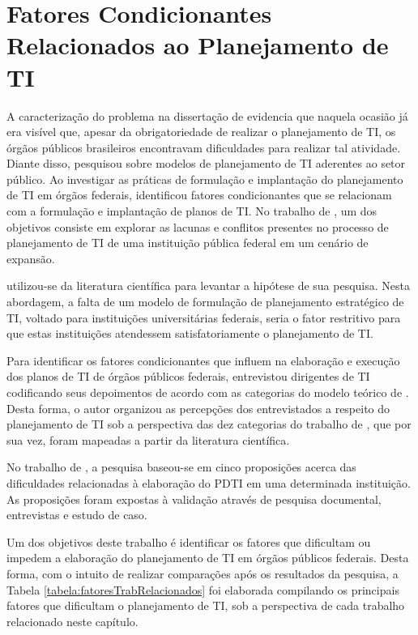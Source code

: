 \section{Fatores Condicionantes Relacionados ao Planejamento de TI}
A caracterização do problema na dissertação de  evidencia que naquela ocasião já era visível que, apesar da obrigatoriedade de realizar o planejamento de TI, os órgãos públicos brasileiros encontravam dificuldades para realizar tal atividade. Diante disso,  pesquisou sobre modelos de planejamento de TI aderentes ao setor público. Ao investigar as práticas de formulação e implantação do planejamento de TI em órgãos federais,  identificou fatores condicionantes que se relacionam com a formulação e implantação de planos de TI. No trabalho de , um dos objetivos consiste em explorar as lacunas e conflitos presentes no processo de planejamento de TI de uma instituição pública federal em um cenário de expansão.


 utilizou-se da literatura científica para levantar a hipótese de sua pesquisa. Nesta abordagem, a falta de um modelo de formulação de planejamento estratégico de TI, voltado para instituições universitárias federais, seria o fator restritivo para que estas instituições atendessem satisfatoriamente o planejamento de TI. 

Para identificar os fatores condicionantes que influem na elaboração e execução dos planos de TI de órgãos públicos federais,  entrevistou dirigentes de TI codificando seus depoimentos de acordo com as categorias do modelo teórico de . Desta forma, o autor organizou as percepções dos entrevistados a respeito do planejamento de TI sob a perspectiva das dez categorias do trabalho de , que por sua vez, foram mapeadas a partir da literatura científica.

No trabalho de , a pesquisa baseou-se em cinco proposições acerca das dificuldades relacionadas à elaboração do PDTI em uma determinada instituição. As proposições foram expostas à validação através de pesquisa documental, entrevistas e estudo de caso.

Um dos objetivos deste trabalho é identificar os fatores que dificultam ou impedem a elaboração do planejamento de TI em órgãos públicos federais. Desta forma, com o intuito de realizar comparações após os resultados da pesquisa, a Tabela \ref{tabela:fatoresTrabRelacionados} foi elaborada compilando os principais fatores que dificultam o planejamento de TI, sob a perspectiva de cada trabalho relacionado neste capítulo.

